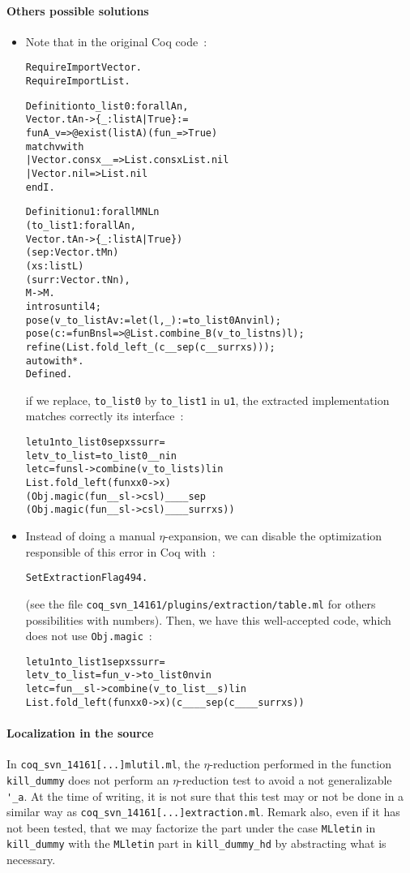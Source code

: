 \documentclass[a4paper, 11pt]{article}
\newenvironment{coq}
  {%
   \begin{alltt}
   \footnotesize} %% 8.3pl2 (April 2011)
  {\end{alltt} %
  }
\newenvironment{ml}
  {%
   \begin{alltt}
   \footnotesize} %% 3.12.1
  {\end{alltt} %
  }
\newcommand{\coqv}{14161}
\begin{document}
\paragraph{Others possible solutions}
\begin{itemize}
\item
Note that in the original Coq code~:
\begin{coq}
Require Import Vector.
Require Import List.

Definition to_list0 : forall A n,
  Vector.t A n -> \{ _ : list A | True \} :=
  fun A _ v => @exist (list A) (fun _ => True) 
    match v with 
    | Vector.cons x _ _ => List.cons x List.nil
    | Vector.nil => List.nil
    end I.

Definition u1 : forall M N L n
  (to_list1 : forall A n,
  Vector.t A n -> \{ _ : list A | True \})
  (sep : Vector.t M n)
  (xs : list L)
  (surr : Vector.t N n),
  M -> M.
  intros until 4;
  pose (v_to_list A v := let (l, _) := to_list0 A n v in l);
  pose (c := fun B n s l => @List.combine _ B (v_to_list n s) l);
  refine (List.fold_left _ (c _ _ sep (c _ _ surr xs)));
  auto with *.
Defined.
\end{coq}
if we replace, \verb|to_list0| by \verb|to_list1| in \verb|u1|, the extracted implementation matches correctly its interface~:
\begin{ml}
let u1 n to_list0 sep xs surr =
  let v_to_list = to_list0 __ n in
  let c = fun s l -> combine (v_to_list s) l in
  List.fold_left (fun x x0 -> x)
    (Obj.magic (fun _ _ s l -> c s l) __ __ sep
      (Obj.magic (fun _ _ s l -> c s l) __ __ surr xs))
\end{ml}

\item
Instead of doing a manual $\eta$-expansion, we can disable the optimization responsible of this error in Coq with~:
\begin{coq}
Set Extraction Flag 494.
\end{coq}
(see the file {\tt coq\_svn\_\coqv/plugins/extraction/table.ml} for others possibilities with numbers).
Then, we have this well-accepted code, which does not use \verb|Obj.magic|~:
\begin{ml}
let u1 n to_list1 sep xs surr =
  let v_to_list = fun _ v -> to_list0 n v in
  let c = fun _ _ s l -> combine (v_to_list __ s) l in
  List.fold_left (fun x x0 -> x) (c __ __ sep (c __ __ surr xs))
\end{ml}
\end{itemize}

\paragraph{Localization in the source}
In {\tt coq\_svn\_\coqv[...]mlutil.ml}, the $\eta$-reduction performed in the function \verb|kill_dummy| does not perform an $\eta$-reduction test to avoid a not generalizable \verb|'_a|. At the time of writing, it is not sure that this test may or not be done in a similar way as {\tt coq\_svn\_\coqv[...]extraction.ml}.
Remark also, even if it has not been tested, that we may factorize the part under the case \verb|MLletin| in \verb|kill_dummy| with the \verb|MLletin| part in \verb|kill_dummy_hd| by abstracting what is necessary.
\end{document}
